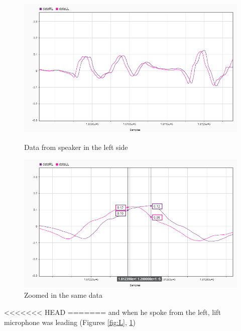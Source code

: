 \begin{figure}[htp]
\centering
\begin{minipage}{.5\textwidth}
  \centering
  \includegraphics[width=1\linewidth]{Illustrations/DataL.png}
  \caption{Data from speaker in the left side}
  \label{fig:L}
\end{minipage}%
\begin{minipage}{.5\textwidth}
  \centering
  \includegraphics[width=1\linewidth]{Illustrations/DataL_with_Markers.png}
  \caption{Zoomed in the same data}
  \label{fig:closeL}
\end{minipage}
\end{figure}

<<<<<<< HEAD
=======
 and when he spoke from the left, lift microphone was leading (Figures  \ref{fig:L}, \ref{fig:closeL})
 
